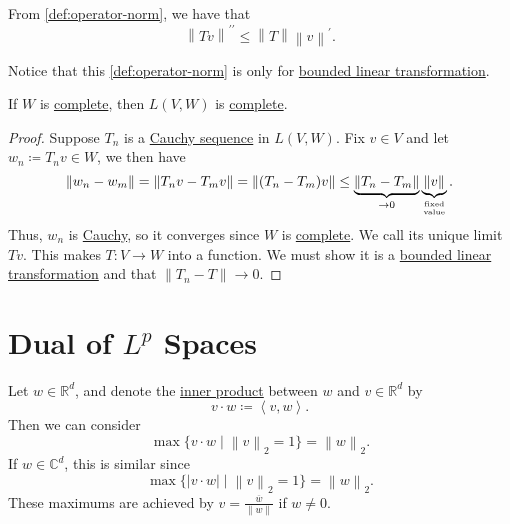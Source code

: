 \begin{prev}
	From \autoref{def:operator-norm}, we have that
	\[
		\left\lVert Tv\right\rVert ^{\prime\prime} \leq \left\lVert T\right\rVert \left\lVert v\right\rVert ^\prime .
	\]
\end{prev}

\begin{remark}
	Notice that this \autoref{def:operator-norm} is only for \hyperref[def:bounded-linear-transformation]{bounded linear transformation}.
\end{remark}

\begin{theorem}\label{thm:blts-complete}
	If \(W\) is \hyperref[def:complete]{complete}, then \(L(V,W)\) is \hyperref[def:complete]{complete}.
\end{theorem}

\begin{proof}
	Suppose \(T_n\) is a \hyperref[def:Cauchy-sequence]{Cauchy sequence} in \(L(V,W)\). Fix \(v \in V\) and let \(w_n \coloneqq T_n v \in W\), we then have
	\[
		\left\lVert w_n - w_m\right\rVert = \left\lVert T_n v - T_m v\right\rVert = \left\lVert (T_n - T_m)v\right\rVert
		\leq \underbrace{\left\lVert T_n - T_m\right\rVert}_{\to 0} \underbrace{\left\lVert v\right\rVert}_{\text{fixed}\atop \text{value}}.
	\]
	Thus, \(w_n\) is \hyperref[def:Cauchy-sequence]{Cauchy}, so it converges since \(W\) is \hyperref[def:complete]{complete}. We call its unique
	limit \(Tv\). This makes \(T \colon V \to W\) into a function. We must show it is a \hyperref[def:bounded-linear-transformation]{bounded linear transformation} and that
	\(\left\lVert T_n - T\right\rVert \to 0\).
\end{proof}

\section{Dual of \(L^p\) Spaces}
\begin{eg}
	Let \(w \in \mathbb{R} ^d\), and denote the \hyperref[def:inner-product]{inner product} between \(w\) and \(v\in \mathbb{R} ^d\) by
	\[
		v\cdot w \coloneqq \left< v, w \right>.
	\]
	Then we can consider
	\[
		\max\{v \cdot w \mid \left\lVert v\right\rVert_2 = 1\} = \left\lVert w\right\rVert_2.
	\]
	If \(w \in \mathbb{C}^d\), this is similar since
	\[
		\max\{\left\vert v \cdot w \right\vert  \mid \left\lVert v\right\rVert_2 = 1\} = \left\lVert w\right\rVert_2.
	\]
	These maximums are achieved by \(v = \frac{\overline{w} }{\left\lVert w\right\rVert}\) if \(w \neq 0\).
\end{eg}

